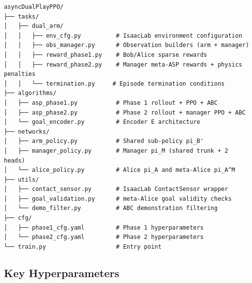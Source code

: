 \documentclass[12pt, a4paper]{article}
\begin{document}
\begin{verbatim}
asyncDualPlayPPO/
├── tasks/
│   ├── dual_arm/
│   │   ├── env_cfg.py          # IsaacLab environment configuration
│   │   ├── obs_manager.py      # Observation builders (arm + manager)
│   │   ├── reward_phase1.py    # Bob/Alice sparse rewards
│   │   ├── reward_phase2.py    # Manager meta-ASP rewards + physics penalties
│   │   └── termination.py     # Episode termination conditions
├── algorithms/
│   ├── asp_phase1.py           # Phase 1 rollout + PPO + ABC
│   ├── asp_phase2.py           # Phase 2 rollout + manager PPO + ABC
│   └── goal_encoder.py         # Encoder E architecture
├── networks/
│   ├── arm_policy.py           # Shared sub-policy pi_B'
│   ├── manager_policy.py       # Manager pi_M (shared trunk + 2 heads)
│   └── alice_policy.py         # Alice pi_A and meta-Alice pi_A^M
├── utils/
│   ├── contact_sensor.py       # IsaacLab ContactSensor wrapper
│   ├── goal_validation.py      # meta-Alice goal validity checks
│   └── demo_filter.py          # ABC demonstration filtering
├── cfg/
│   ├── phase1_cfg.yaml         # Phase 1 hyperparameters
│   └── phase2_cfg.yaml         # Phase 2 hyperparameters
└── train.py                    # Entry point
\end{verbatim}

\subsection{Key Hyperparameters}
\label{subsec:hyperparams}
\end{document}
